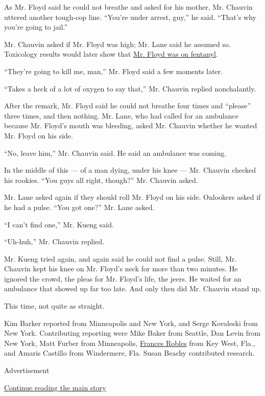 As Mr. Floyd said he could not breathe and asked for his mother, Mr.
Chauvin uttered another tough-cop line. ``You're under arrest, guy,'' he
said. ``That's why you're going to jail.''

Mr. Chauvin asked if Mr. Floyd was high; Mr. Lane said he assumed so.
Toxicology results would later show that
\href{https://www.nytimes3xbfgragh.onion/article/george-floyd-autopsy-michael-baden.html}{Mr.
Floyd was on fentanyl}.

``They're going to kill me, man,'' Mr. Floyd said a few moments later.

``Takes a heck of a lot of oxygen to say that,'' Mr. Chauvin replied
nonchalantly.

After the remark, Mr. Floyd said he could not breathe four times and
``please'' three times, and then nothing. Mr. Lane, who had called for
an ambulance because Mr. Floyd's mouth was bleeding, asked Mr. Chauvin
whether he wanted Mr. Floyd on his side.

``No, leave him,'' Mr. Chauvin said. He said an ambulance was coming.

In the middle of this --- of a man dying, under his knee --- Mr. Chauvin
checked his rookies. ``You guys all right, though?'' Mr. Chauvin asked.

Mr. Lane asked again if they should roll Mr. Floyd on his side.
Onlookers asked if he had a pulse. ``You got one?'' Mr. Lane asked.

``I can't find one,'' Mr. Kueng said.

``Uh-huh,'' Mr. Chauvin replied.

Mr. Kueng tried again, and again said he could not find a pulse. Still,
Mr. Chauvin kept his knee on Mr. Floyd's neck for more than two minutes.
He ignored the crowd, the pleas for Mr. Floyd's life, the jeers. He
waited for an ambulance that showed up far too late. And only then did
Mr. Chauvin stand up.

This time, not quite as straight.

Kim Barker reported from Minneapolis and New York, and Serge Kovaleski
from New York. Contributing reporting were Mike Baker from Seattle, Dan
Levin from New York, Matt Furber from Minneapolis,
\href{https://www.nytimes3xbfgragh.onion/by/frances-robles}{Frances
Robles} from Key West, Fla., and Amaris Castillo from Windermere, Fla.
Susan Beachy contributed research.

Advertisement

\protect\hyperlink{after-bottom}{Continue reading the main story}

